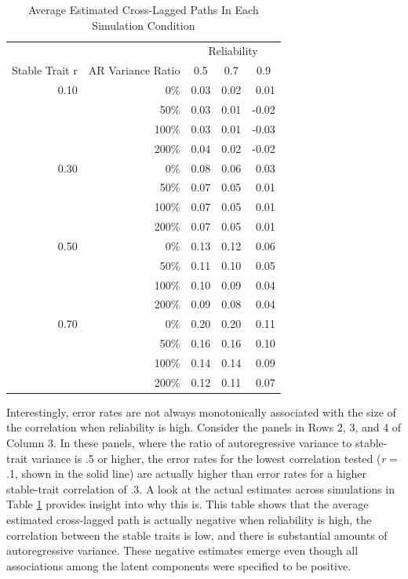 \documentclass[
  english,
  man,floatsintext]{apa6}
\begin{document}
\begin{table}[tbp]

\begin{center}
\begin{threeparttable}

\caption{\label{tab:simTab}Average Estimated Cross-Lagged Paths In Each Simulation Condition}

\begin{tabular}{rrrrr}
\toprule
 &  & \multicolumn{3}{c}{Reliability} \\
\cmidrule(r){3-5}
Stable Trait r & \multicolumn{1}{c}{AR Variance Ratio} & \multicolumn{1}{c}{0.5} & \multicolumn{1}{c}{0.7} & \multicolumn{1}{c}{0.9}\\
\midrule
0.10 & 0\% & 0.03 & 0.02 & 0.01\\
 & 50\% & 0.03 & 0.01 & -0.02\\
 & 100\% & 0.03 & 0.01 & -0.03\\
 & 200\% & 0.04 & 0.02 & -0.02\\ \midrule
0.30 & 0\% & 0.08 & 0.06 & 0.03\\
 & 50\% & 0.07 & 0.05 & 0.01\\
 & 100\% & 0.07 & 0.05 & 0.01\\
 & 200\% & 0.07 & 0.05 & 0.01\\ \midrule
0.50 & 0\% & 0.13 & 0.12 & 0.06\\
 & 50\% & 0.11 & 0.10 & 0.05\\
 & 100\% & 0.10 & 0.09 & 0.04\\
 & 200\% & 0.09 & 0.08 & 0.04\\ \midrule
0.70 & 0\% & 0.20 & 0.20 & 0.11\\
 & 50\% & 0.16 & 0.16 & 0.10\\
 & 100\% & 0.14 & 0.14 & 0.09\\
 & 200\% & 0.12 & 0.11 & 0.07\\
\bottomrule
\end{tabular}

\end{threeparttable}
\end{center}

\end{table}

Interestingly, error rates are not always monotonically associated with the size of the correlation when reliability is high. Consider the panels in Rows 2, 3, and 4 of Column 3. In these panels, where the ratio of autoregressive variance to stable-trait variance is .5 or higher, the error rates for the lowest correlation tested (\emph{r} = .1, shown in the solid line) are actually higher than error rates for a higher stable-trait correlation of .3. A look at the actual estimates across simulations in Table \ref{tab:simTab} provides insight into why this is. This table shows that the average estimated cross-lagged path is actually negative when reliability is high, the correlation between the stable traits is low, and there is substantial amounts of autoregressive variance. These negative estimates emerge even though all associations among the latent components were specified to be positive.
\end{document}
